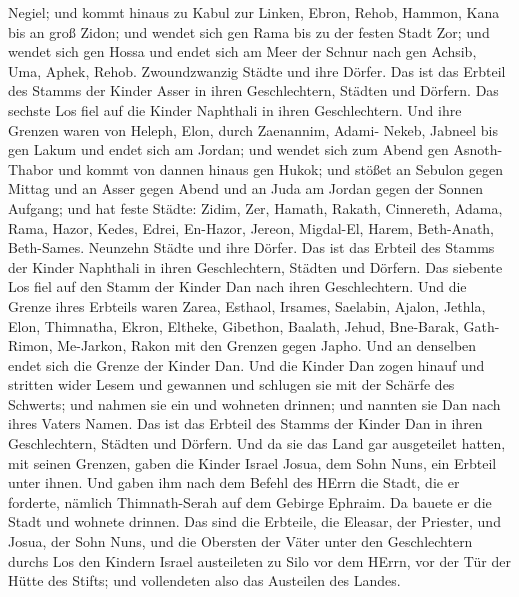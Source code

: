 Negiel; und kommt hinaus zu Kabul zur Linken,  Ebron,
Rehob, Hammon, Kana bis an groß Zidon;  und wendet sich gen
Rama bis zu der festen Stadt Zor; und wendet sich gen Hossa und endet
sich am Meer der Schnur nach gen Achsib,  Uma, Aphek,
Rehob. Zwoundzwanzig Städte und ihre Dörfer.  Das ist das
Erbteil des Stamms der Kinder Asser in ihren Geschlechtern, Städten und
Dörfern.  Das sechste Los fiel auf die Kinder Naphthali in
ihren Geschlechtern.  Und ihre Grenzen waren von Heleph,
Elon, durch Zaenannim, Adami- Nekeb, Jabneel bis gen Lakum und endet
sich am Jordan;  und wendet sich zum Abend gen
Asnoth-Thabor und kommt von dannen hinaus gen Hukok; und stößet an
Sebulon gegen Mittag und an Asser gegen Abend und an Juda am Jordan
gegen der Sonnen Aufgang;  und hat feste Städte: Zidim,
Zer, Hamath, Rakath, Cinnereth,  Adama, Rama, Hazor,
 Kedes, Edrei, En-Hazor,  Jereon, Migdal-El,
Harem, Beth-Anath, Beth-Sames. Neunzehn Städte und ihre Dörfer.
 Das ist das Erbteil des Stamms der Kinder Naphthali in
ihren Geschlechtern, Städten und Dörfern.  Das siebente Los
fiel auf den Stamm der Kinder Dan nach ihren Geschlechtern.
 Und die Grenze ihres Erbteils waren Zarea, Esthaol,
Irsames,  Saelabin, Ajalon, Jethla,  Elon,
Thimnatha, Ekron,  Eltheke, Gibethon, Baalath,
 Jehud, Bne-Barak, Gath-Rimon,  Me-Jarkon,
Rakon mit den Grenzen gegen Japho.  Und an denselben endet
sich die Grenze der Kinder Dan. Und die Kinder Dan zogen hinauf und
stritten wider Lesem und gewannen und schlugen sie mit der Schärfe des
Schwerts; und nahmen sie ein und wohneten drinnen; und nannten sie Dan
nach ihres Vaters Namen.  Das ist das Erbteil des Stamms
der Kinder Dan in ihren Geschlechtern, Städten und Dörfern.
 Und da sie das Land gar ausgeteilet hatten, mit seinen
Grenzen, gaben die Kinder Israel Josua, dem Sohn Nuns, ein Erbteil unter
ihnen.  Und gaben ihm nach dem Befehl des HErrn die Stadt,
die er forderte, nämlich Thimnath-Serah auf dem Gebirge Ephraim. Da
bauete er die Stadt und wohnete drinnen.  Das sind die
Erbteile, die Eleasar, der Priester, und Josua, der Sohn Nuns, und die
Obersten der Väter unter den Geschlechtern durchs Los den Kindern Israel
austeileten zu Silo vor dem HErrn, vor der Tür der Hütte des Stifts; und
vollendeten also das Austeilen des Landes.

